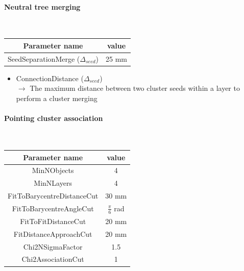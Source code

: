 \documentclass[cits]{JINST}
\begin{document}
\paragraph{Neutral tree merging} ~

\begin{table}[!ht]
  \begin{center}
    \begin{tabu} to \linewidth { c | c } 
          Parameter name & value \\
          \hline
          SeedSeparationMerge ($\Delta_{seed}$) & 25 mm
    \end{tabu}
  \end{center}
\end{table}

\begin{itemize}
  \item ConnectionDistance ($\Delta_{seed}$) \\
  $\rightarrow$ The maximum distance between two cluster seeds within a layer to perform a cluster merging
\end{itemize}


\paragraph{Pointing cluster association} ~

\begin{table}[!ht]
  \begin{center}
    \begin{tabu} to \linewidth { c | c } 
          Parameter name & value \\
          \hline
          MinNObjects & 4 \\
          MinNLayers & 4 \\
          FitToBarycentreDistanceCut & 30 mm \\
          FitToBarycentreAngleCut & $\frac{\pi}{6}$ rad \\
          FitToFitDistanceCut & 20 mm \\
          FitDistanceApproachCut & 20 mm \\
          Chi2NSigmaFactor & 1.5 \\
          Chi2AssociationCut & 1
    \end{tabu}
  \end{center}
\end{table}
\end{document}

